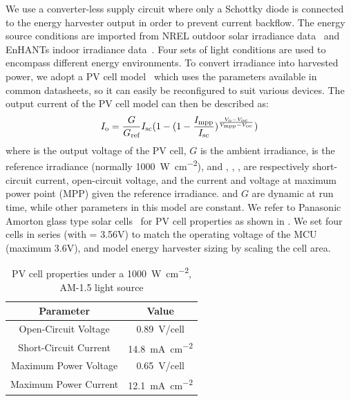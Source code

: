 We use a converter-less supply circuit where only a Schottky diode is connected to the energy harvester output in order to prevent current backflow. 
The energy source conditions are imported from NREL outdoor solar irradiance data~\cite{stoffel1981nrel} and EnHANTs indoor irradiance data~\cite{6244798}. 
Four sets of light conditions are used to encompass different energy environments. 
To convert irradiance into harvested power, we adopt a PV cell model~\cite{en9050326} which uses the parameters available in common datasheets, so it can easily be reconfigured to suit various devices. 
The output current  of the PV cell model can then be described as:
\begin{equation} \label{eq:pvcell}
    I_{\text{o}} = \frac{G}{G_{\text{ref}}} I_{\text{sc}} (1 - (1 - \frac{I_{\text{mpp}}}{I_{\text{sc}}}) ^ {\frac{V_{\text{o}}-V_{\text{oc}}}{V_{\text{mpp}} - V_{\text{oc}}}})
\end{equation}
where  is the output voltage of the PV cell, $G$ is the ambient irradiance,  is the reference irradiance (normally \SI{1000}{\watt\per\square\centi\meter}), and , , ,  are respectively short-circuit current, open-circuit voltage, and the current and voltage at maximum power point (MPP) given the reference irradiance. 
 and $G$ are dynamic at run time, while other parameters in this model are constant. 
We refer to Panasonic Amorton glass type solar cells~\cite{solarcell} for PV cell properties as shown in . 
We set four cells in series (with  = 3.56V) to match the operating voltage of the MCU (maximum 3.6V), and model energy harvester sizing by scaling the cell area. 



\begin{table}
    \renewcommand{\arraystretch}{1.2}
    \centering
    \caption{PV cell properties under a \SI{1000}{\watt\per\square\centi\meter}, AM-1.5 light source}
    \label{tab:pvcell}
    \begin{tabular}{|c|c|}
    \hline
    \textbf{Parameter} & \textbf{Value}\\
    \hline
    Open-Circuit Voltage & \SI{0.89}{\volt}/cell\\
    Short-Circuit Current & \SI{14.8}{\milli\ampere\per\square\centi\meter}\\
    Maximum Power Voltage & \SI{0.65}{\volt}/cell\\ 
    Maximum Power Current & \SI{12.1}{\milli\ampere\per\square\centi\meter}\\
    \hline
    \end{tabular}
\end{table}

